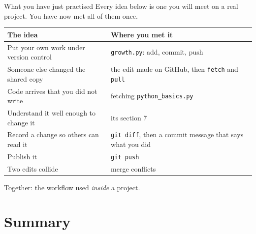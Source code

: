 \documentclass[aspectratio=169,11pt]{beamer}
\begin{document}
\begin{frame}{What you have just practised}
\vspace{0.2em}
Every idea below is one you will meet on a real project. You have now met all
of them once.
\vspace{0.7em}

{\small
\begin{tabular}{@{}p{}p{}@{}}
  \toprule
  \textbf{The idea} & \textbf{Where you met it} \\
  \midrule
  Put your own work under version control
    & \texttt{growth.py}: add, commit, push \\[0.35em]
  Someone else changed the shared copy
    & the edit made on GitHub, then \texttt{fetch} and \texttt{pull} \\[0.35em]
  Code arrives that you did not write
    & fetching \texttt{python\_basics.py} \\[0.35em]
  Understand it well enough to change it
    & its section 7 \\[0.35em]
  Record a change so others can read it
    & \texttt{git diff}, then a commit message that says what you did \\[0.35em]
  Publish it
    & \texttt{git push} \\[0.35em]
  Two edits collide
    & merge conflicts \\
  \bottomrule
\end{tabular}}

\vspace{0.5em}
\begin{center}
  \color{Muted}\small
  Together: the workflow used \emph{inside} a project.
\end{center}
\end{frame}

\section{Summary}
\end{document}

